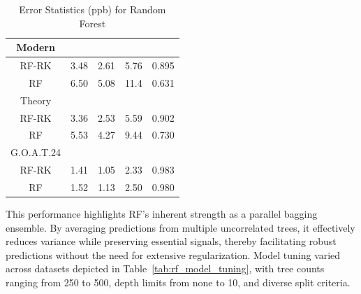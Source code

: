 \begin{table}[h!]
\begin{tabular}{||c|cccc||}
            Modern	&   &   &   &   \\[3pt]
            \hline
            RF-RK &  3.48 & 2.61 &  5.76 & 0.895 \\[3pt]
               RF &  6.50 & 5.08 & 11.4  & 0.631 \\
            \hline
            Theory	&   &   &   &   \\[3pt]
            \hline
            RF-RK & 3.36 & 2.53 &  5.59 & 0.902 \\[3pt]
               RF & 5.53 & 4.27 &  9.44 & 0.730 \\
            \hline  
            G.O.A.T.24	&   &   &   &   \\[3pt]
            \hline 
            RF-RK & 1.41 & 1.05 &  2.33 & 0.983 \\[3pt]
               RF & 1.52 & 1.13 &  2.50 & 0.980 \\
            \hline
        \end{tabular}
    \caption{Error Statistics (ppb) for Random Forest} 
    \label{tab:rf_model_error}
\end{table} This performance highlights RF’s inherent strength as a parallel bagging ensemble. By averaging predictions from multiple uncorrelated trees, it effectively reduces variance while preserving essential signals, thereby facilitating robust predictions without the need for extensive regularization. Model tuning varied across datasets depicted in Table~\ref{tab:rf_model_tuning}, with tree counts ranging from 250 to 500, depth limits from none to 10, and diverse split criteria. 

